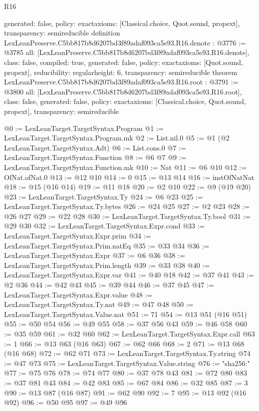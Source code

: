 \begin{lexlean}{R16}
\begin{coremodule}
{  generated: false,
  policy: exact{axioms: [Classical.choice, Quot.sound, propext]},
  transparency: semireducible
}
definition LexLeanPreserve.C5bb817b8d6207bd3f89adaf093ca5e93.R16.denote : @3776 := @3785 {
  all: [LexLeanPreserve.C5bb817b8d6207bd3f89adaf093ca5e93.R16.denote],
  class: false,
  compiled: true,
  generated: false,
  policy: exact{axioms: [Quot.sound, propext]},
  reducibility: regular{height: 6},
  transparency: semireducible
}
theorem LexLeanPreserve.C5bb817b8d6207bd3f89adaf093ca5e93.R16.root : @3791 := @3800 {
  all: [LexLeanPreserve.C5bb817b8d6207bd3f89adaf093ca5e93.R16.root],
  class: false,
  generated: false,
  policy: exact{axioms: [Classical.choice, Quot.sound, propext]},
  transparency: semireducible
}

@0 := LexLeanTarget.TargetSyntax.Program
@1 := LexLeanTarget.TargetSyntax.Program.mk
@2 := List.nil.{0}
@5 := @1 (@2 LexLeanTarget.TargetSyntax.Adt)
@6 := List.cons.{0}
@7 := LexLeanTarget.TargetSyntax.Function
@8 := @6 @7
@9 := LexLeanTarget.TargetSyntax.Function.mk
@10 := Nat
@11 := @6 @10
@12 := OfNat.ofNat.{0}
@13 := @12 @10
@14 := 0
@15 := @13 @14
@16 := instOfNatNat
@18 := @15 (@16 @14)
@19 := @11 @18
@20 := @2 @10
@22 := @9 (@19 @20)
@23 := LexLeanTarget.TargetSyntax.Ty
@24 := @6 @23
@25 := LexLeanTarget.TargetSyntax.Ty.bytes
@26 := @24 @25
@27 := @2 @23
@28 := @26 @27
@29 := @22 @28
@30 := LexLeanTarget.TargetSyntax.Ty.bool
@31 := @29 @30
@32 := LexLeanTarget.TargetSyntax.Expr.cond
@33 := LexLeanTarget.TargetSyntax.Expr.prim
@34 := LexLeanTarget.TargetSyntax.Prim.natEq
@35 := @33 @34
@36 := LexLeanTarget.TargetSyntax.Expr
@37 := @6 @36
@38 := LexLeanTarget.TargetSyntax.Prim.length
@39 := @33 @38
@40 := LexLeanTarget.TargetSyntax.Expr.var
@41 := @40 @18
@42 := @37 @41
@43 := @2 @36
@44 := @42 @43
@45 := @39 @44
@46 := @37 @45
@47 := LexLeanTarget.TargetSyntax.Expr.value
@48 := LexLeanTarget.TargetSyntax.Ty.nat
@49 := @47 @48
@50 := LexLeanTarget.TargetSyntax.Value.nat
@51 := 71
@54 := @13 @51 (@16 @51)
@55 := @50 @54
@56 := @49 @55
@58 := @37 @56 @43
@59 := @46 @58
@60 := @35 @59
@61 := @32 @60
@62 := LexLeanTarget.TargetSyntax.Expr.call
@63 := 1
@66 := @13 @63 (@16 @63)
@67 := @62 @66
@68 := 2
@71 := @13 @68 (@16 @68)
@72 := @62 @71
@73 := LexLeanTarget.TargetSyntax.Ty.string
@74 := @47 @73
@75 := LexLeanTarget.TargetSyntax.Value.string
@76 := "sha256:"
@77 := @75 @76
@78 := @74 @77
@80 := @37 @78 @43
@81 := @72 @80
@83 := @37 @81 @43
@84 := @42 @83
@85 := @67 @84
@86 := @32 @85
@87 := 3
@90 := @13 @87 (@16 @87)
@91 := @62 @90
@92 := 7
@95 := @13 @92 (@16 @92)
@96 := @50 @95
@97 := @49 @96

\end{coremodule}
\end{lexlean}
